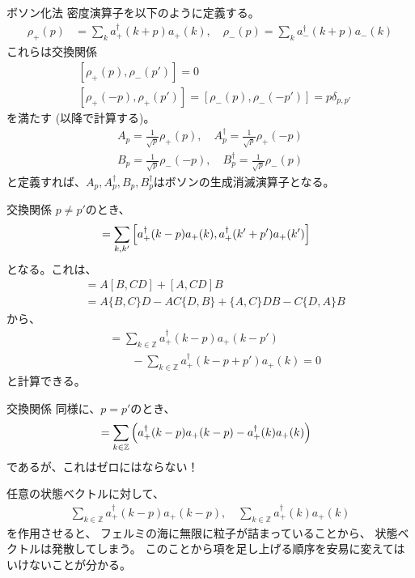 \documentclass[\main/TL_liquid.tex]{subfiles}
\begin{document}
\begin{frame}{ボソン化法}
    密度演算子を以下のように定義する。
    \begin{align}
        \rho_+(p) &= \sum_k a_+^\dagger(k+p)a_+(k),
        \quad
        \rho_-(p) = \sum_k a_-^\dagger(k+p)a_-(k)
    \end{align}
    これらは交換関係
    \begin{align}
        &
        [\rho_+(p), \rho_-(p')] = 0
        \label{comm: RL}
        \\ &
        [\rho_+(-p), \rho_+(p')]
        = [\rho_-(p),\rho_-(-p')]
        = p\delta_{p,p'}
        \label{comm RR, LL}
    \end{align}
    を満たす (以降で計算する)。
    \begin{align}
        A_p = \frac{1}{\sqrt{p}} \rho_+(p), \quad
        A_p^\dagger = \frac{1}{\sqrt{p}} \rho_+(-p)
        \\
        B_p = \frac{1}{\sqrt{p}} \rho_-(-p), \quad
        B_p^\dagger = \frac{1}{\sqrt{p}}\rho_-(p)
    \end{align}
    と定義すれば、$A_p,A_p^\dagger,B_p,B_p^\dagger$はボソンの生成消滅演算子となる。
\end{frame}

\begin{frame}{交換関係}
    $p \ne p'$のとき、
    \begin{align}
        [\rho_+(-p),\rho_+(p')]
        &
        = \sum_{k,k'}\qty[a_+^\dagger(k-p)a_+(k),a_+^\dagger(k'+p') a_+(k')]
    \end{align}
    となる。これは、
    \begin{align}
        [AB,CD] &= A[B,CD] + [A,CD]B
        \\ &
        = A\{B,C\}D - AC\{D,B\} + \{A,C\}DB - C \{D,A\}B
    \end{align}
    から、
    \begin{align}
        [\rho_+(-p),\rho_+(p')]
        &
        = \sum_{k \in \mathbb{Z}} a_+^\dagger(k-p) a_+(k-p')
        \\ & \quad\quad
        - \sum_{k \in \mathbb{Z}} a_+^\dagger(k-p+p') a_+(k)
        = 0
    \end{align} 
    と計算できる。
\end{frame}

\begin{frame}{交換関係}
    同様に、$p=p'$のとき、
    \begin{align}
        [\rho_+(-p),\rho_+(p)]
        &
        = \sum_{k \in \mathbb{Z}} \qty(a_+^\dagger(k-p) a_+(k-p)-a_+^\dagger(k)a_+(k))
    \end{align}
    であるが、\alert{これはゼロにはならない！}

    任意の状態ベクトルに対して、
    \begin{align}
        \sum_{k \in \mathbb{Z}} a_+^\dagger(k-p) a_+(k-p),
        \quad
        \sum_{k \in \mathbb{Z}} a_+^\dagger(k)a_+(k)
    \end{align}
    を作用させると、
    フェルミの海に無限に粒子が詰まっていることから、
    状態ベクトルは発散してしまう。
    このことから項を足し上げる順序を安易に変えてはいけないことが分かる。
\end{frame}
\end{document}
